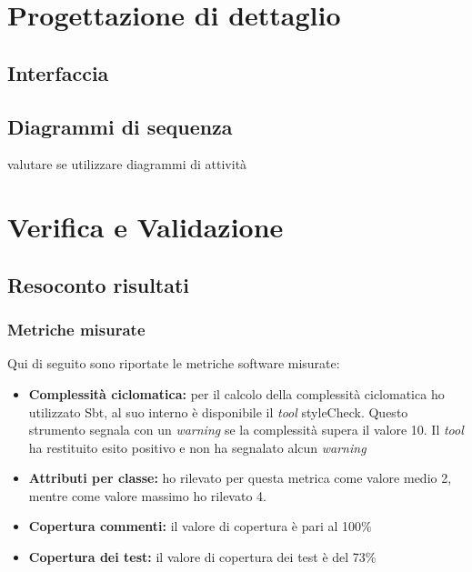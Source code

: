 \section{Progettazione di dettaglio}
\subsection{Interfaccia}
\subsection{Diagrammi di sequenza}
valutare se utilizzare diagrammi di attività




\section{Verifica e Validazione}
\subsection{Resoconto risultati}
\subsubsection{Metriche misurate}
Qui di seguito sono riportate le metriche software misurate:
\begin{itemize}
\item \textbf{Complessità ciclomatica:} per il calcolo della complessità ciclomatica ho utilizzato Sbt, al suo interno è disponibile il \emph{tool} styleCheck. Questo strumento segnala con un \emph{warning} se la complessità supera il valore 10. Il \emph{tool} ha restituito esito positivo e non ha segnalato alcun \emph{warning}
\item \textbf{Attributi per classe:} ho rilevato per questa metrica come valore medio 2, mentre come valore massimo ho rilevato 4.
\item \textbf{Copertura commenti:} il valore di copertura è pari al 100\%
\item \textbf{Copertura dei test:} il valore di copertura dei test è del 73\%
\end{itemize}

